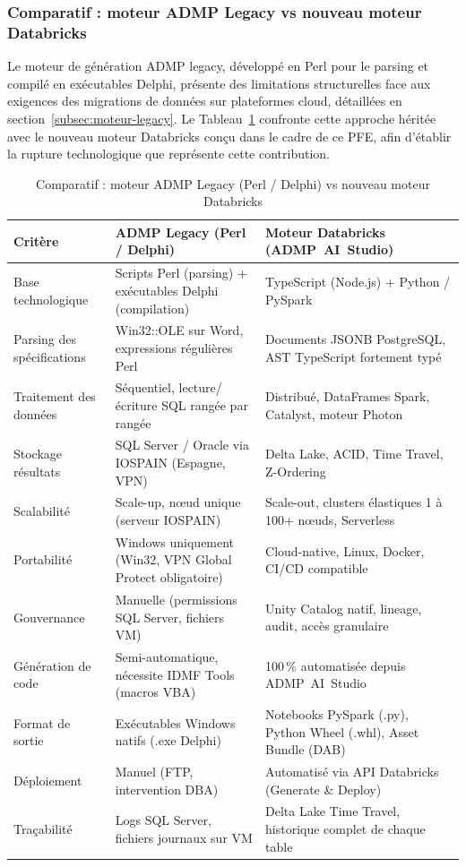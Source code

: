 \subsubsection*{Comparatif : moteur ADMP Legacy vs nouveau moteur Databricks}

Le moteur de génération ADMP legacy, développé en Perl pour le parsing et compilé en exécutables Delphi, présente des limitations structurelles face aux exigences des migrations de données sur plateformes cloud, détaillées en section~\ref{subsec:moteur-legacy}. Le Tableau~\ref{tab:legacy-vs-databricks} confronte cette approche héritée avec le nouveau moteur Databricks conçu dans le cadre de ce PFE, afin d'établir la rupture technologique que représente cette contribution.

\begin{table}[H]
\centering
\caption{Comparatif : moteur ADMP Legacy (Perl / Delphi) vs nouveau moteur Databricks}
\label{tab:legacy-vs-databricks}
\begin{tabularx}{\textwidth}{lXX}
\toprule
\textbf{Critère} & \textbf{ADMP Legacy (Perl / Delphi)} & \textbf{Moteur Databricks (ADMP~AI~Studio)} \\
\midrule
Base technologique &
  Scripts Perl (parsing) + exécutables Delphi (compilation) &
  TypeScript (Node.js) + Python / PySpark \\
\addlinespace
Parsing des spécifications &
  Win32::OLE sur Word, expressions régulières Perl &
  Documents JSONB PostgreSQL, AST TypeScript fortement typé \\
\addlinespace
Traitement des données &
  Séquentiel, lecture/écriture SQL rangée par rangée &
  Distribué, DataFrames Spark, Catalyst, moteur Photon \\
\addlinespace
Stockage résultats &
  SQL Server / Oracle via IOSPAIN (Espagne, VPN) &
  Delta Lake, ACID, Time Travel, Z-Ordering \\
\addlinespace
Scalabilité &
  Scale-up, nœud unique (serveur IOSPAIN) &
  Scale-out, clusters élastiques 1 à 100+ nœuds, Serverless \\
\addlinespace
Portabilité &
  Windows uniquement (Win32, VPN Global Protect obligatoire) &
  Cloud-native, Linux, Docker, CI/CD compatible \\
\addlinespace
Gouvernance &
  Manuelle (permissions SQL Server, fichiers VM) &
  Unity Catalog natif, lineage, audit, accès granulaire \\
\addlinespace
Génération de code &
  Semi-automatique, nécessite IDMF Tools (macros VBA) &
  100\,\% automatisée depuis ADMP~AI~Studio \\
\addlinespace
Format de sortie &
  Exécutables Windows natifs (.exe Delphi) &
  Notebooks PySpark (.py), Python Wheel (.whl), Asset Bundle (DAB) \\
\addlinespace
Déploiement &
  Manuel (FTP, intervention DBA) &
  Automatisé via API Databricks (Generate \& Deploy) \\
\addlinespace
Traçabilité &
  Logs SQL Server, fichiers journaux sur VM &
  Delta Lake Time Travel, historique complet de chaque table \\
\bottomrule
\end{tabularx}
\end{table}

